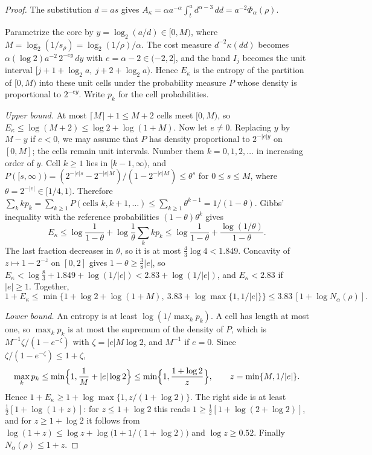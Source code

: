 \begin{proof}
The substitution $d=as$ gives
$A_\kappa=\alpha a^{-\alpha}\int_t^ad^{\alpha-3}\,dd=a^{-2}\Phi_\alpha(\rho)$.

Parametrize the core by $y=\log_2(a/d)\in[0,M)$, where
$M=\log_2(1/s_\rho)=\log_2(1/\rho)/\alpha$. The cost measure
$d^{-2}\kappa(dd)$ becomes
$\alpha(\log2)a^{-2}\,2^{-ey}\,dy$ with $e=\alpha-2\in(-2,2]$, and the
band $I_j$ becomes the unit interval
$[j+1+\log_2a,\ j+2+\log_2a)$. Hence $E_\kappa$ is the entropy of the
partition of $[0,M)$ into these unit cells under the probability measure
$P$ whose density is proportional to $2^{-ey}$. Write $p_k$ for the cell
probabilities.

\emph{Upper bound.} At most $\lceil M\rceil+1\le M+2$ cells meet
$[0,M)$, so $E_\kappa\le\log(M+2)\le\log2+\log(1+M)$. Now let $e\ne0$.
Replacing $y$ by $M-y$ if $e<0$, we may assume that $P$ has density
proportional to $2^{-|e|y}$ on $[0,M]$; the cells remain unit intervals.
Number them $k=0,1,2,\ldots$ in increasing order of $y$. Cell $k\ge1$
lies in $[k-1,\infty)$, and
$P([s,\infty))=(2^{-|e|s}-2^{-|e|M})/(1-2^{-|e|M})\le\theta^s$ for
$0\le s\le M$, where $\theta=2^{-|e|}\in[1/4,1)$. Therefore
$\sum_kkp_k=\sum_{k\ge1}P(\text{cells }k,k+1,\ldots)
 \le\sum_{k\ge1}\theta^{k-1}=1/(1-\theta)$.
Gibbs' inequality with the reference probabilities $(1-\theta)\theta^k$
gives
\[
 E_\kappa\le\log\frac1{1-\theta}+\log\frac1\theta\sum_kkp_k
 \le\log\frac1{1-\theta}+\frac{\log(1/\theta)}{1-\theta}.
\]
The last fraction decreases in $\theta$, so it is at most
$\tfrac43\log4<1.849$. Concavity of $z\mapsto1-2^{-z}$ on $[0,2]$ gives
$1-\theta\ge\tfrac38|e|$, so
$E_\kappa<\log\tfrac83+1.849+\log(1/|e|)<2.83+\log(1/|e|)$, and
$E_\kappa<2.83$ if $|e|\ge1$.
Together,
\[
 1+E_\kappa\le\min\bigl\{1+\log2+\log(1+M),\
 3.83+\log\max\{1,1/|e|\}\bigr\}\le3.83\,[1+\log N_\alpha(\rho)] .
\]

\emph{Lower bound.} An entropy is at least $\log(1/\max_kp_k)$. A cell
has length at most one, so $\max_kp_k$ is at most the supremum of the
density of $P$, which is $M^{-1}\zeta/(1-e^{-\zeta})$ with
$\zeta=|e|M\log2$, and $M^{-1}$ if $e=0$. Since
$\zeta/(1-e^{-\zeta})\le1+\zeta$,
\[
 \max_kp_k\le\min\Bigl\{1,\frac1M+|e|\log2\Bigr\}
 \le\min\Bigl\{1,\frac{1+\log2}{z}\Bigr\},\qquad
 z=\min\{M,1/|e|\}.
\]
Hence $1+E_\kappa\ge1+\log\max\{1,z/(1+\log2)\}$. The right side is at
least $\tfrac12[1+\log(1+z)]$: for $z\le1+\log2$ this reads
$1\ge\tfrac12[1+\log(2+\log2)]$, and for $z\ge1+\log2$ it follows from
$\log(1+z)\le\log z+\log\bigl(1+1/(1+\log2)\bigr)$ and $\log z\ge0.52$.
Finally $N_\alpha(\rho)\le1+z$.
\end{proof}

